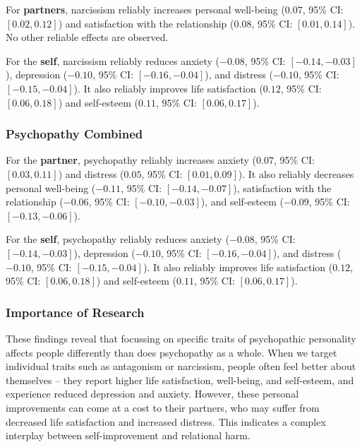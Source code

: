 \documentclass[
  singlecolumn]{article}
\begin{document}
For \textbf{partners}, narcissism reliably increases personal well-being
(\(0.07\), 95\% CI: \([0.02, 0.12]\)) and satisfaction with the
relationship (\(0.08\), 95\% CI: \([0.01, 0.14]\)). No other reliable
effects are observed.

For the \textbf{self}, narcissism reliably reduces anxiety (\(-0.08\),
95\% CI: \([-0.14, -0.03]\)), depression (\(-0.10\), 95\% CI:
\([-0.16, -0.04]\)), and distress (\(-0.10\), 95\% CI:
\([-0.15, -0.04]\)). It also reliably improves life satisfaction
(\(0.12\), 95\% CI: \([0.06, 0.18]\)) and self-esteem (\(0.11\), 95\%
CI: \([0.06, 0.17]\)).

\subsubsection{Psychopathy Combined}\label{psychopathy-combined}

For the \textbf{partner}, psychopathy reliably increases anxiety
(\(0.07\), 95\% CI: \([0.03, 0.11]\)) and distress (\(0.05\), 95\% CI:
\([0.01, 0.09]\)). It also reliably decreases personal well-being
(\(-0.11\), 95\% CI: \([-0.14, -0.07]\)), satisfaction with the
relationship (\(-0.06\), 95\% CI: \([-0.10, -0.03]\)), and self-esteem
(\(-0.09\), 95\% CI: \([-0.13, -0.06]\)).

For the \textbf{self}, psychopathy reliably reduces anxiety (\(-0.08\),
95\% CI: \([-0.14, -0.03]\)), depression (\(-0.10\), 95\% CI:
\([-0.16, -0.04]\)), and distress (\(-0.10\), 95\% CI:
\([-0.15, -0.04]\)). It also reliably improves life satisfaction
(\(0.12\), 95\% CI: \([0.06, 0.18]\)) and self-esteem (\(0.11\), 95\%
CI: \([0.06, 0.17]\)).

\subsubsection{Importance of Research}\label{importance-of-research}

These findings reveal that focussing on specific traits of psychopathic
personality affects people differently than does psychopathy as a whole.
When we target individual traits such as antagonism or narcissism,
people often feel better about themselves -- they report higher life
satisfaction, well-being, and self-esteem, and experience reduced
depression and anxiety. However, these personal improvements can come at
a cost to their partners, who may suffer from decreased life
satisfaction and increased distress. This indicates a complex interplay
between self-improvement and relational harm.
\end{document}
